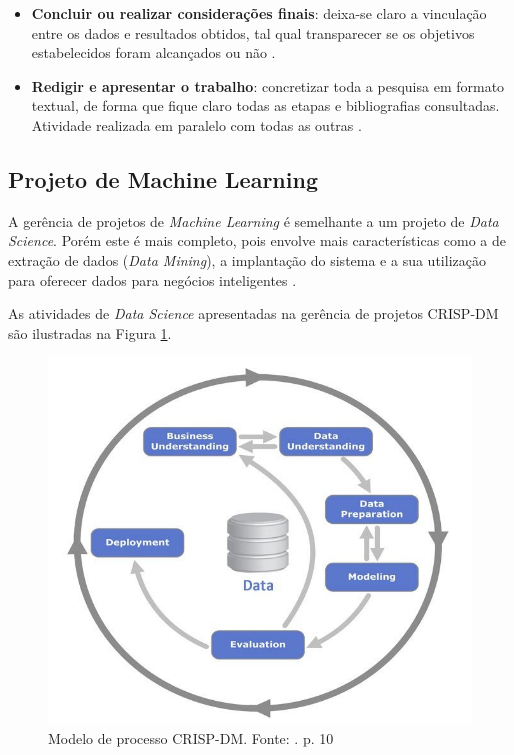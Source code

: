 \begin{itemize}
  \item \textbf{Concluir ou realizar considerações finais}: deixa-se claro a vinculação entre os dados e resultados obtidos, tal qual transparecer se os objetivos estabelecidos foram alcançados ou não \cite{GIL2002}.
  \item \textbf{Redigir e apresentar o trabalho}: concretizar toda a pesquisa em formato textual, de forma que fique claro todas as etapas e bibliografias consultadas. Atividade realizada em paralelo com todas as outras \cite{PRODANOV2013}.
\end{itemize}

\subsection{Projeto de Machine Learning} \label{sec:projetoML}

A gerência de projetos de \textit{Machine Learning} é semelhante a um projeto de \textit{Data Science}. Porém este é mais completo, pois envolve mais características como a de extração de dados (\textit{Data Mining}), a implantação do sistema e a sua utilização para oferecer dados para negócios inteligentes \cite{CHAPMAN2000}.

As atividades de \textit{Data Science} apresentadas na gerência de projetos CRISP-DM são ilustradas na Figura \ref{fig:crispdmProcess}.

\begin{figure}[h]
	\centering
    \includegraphics[keepaspectratio=true,scale=0.3]{figuras/crispdmProcess}
	\caption[Modelo de processo CRISP-DM]{Modelo de processo CRISP-DM. Fonte: \citeauthor{CHAPMAN2000} \citeyear{CHAPMAN2000}. p. 10}
	\label{fig:crispdmProcess}
\end{figure}

